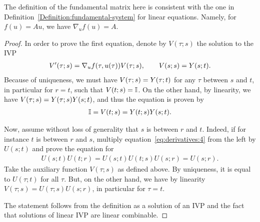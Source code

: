 \begin{remark}
  The definition of the fundamental matrix here is consistent with the
  one in Definition~\ref{Definition:fundamental-system} for linear
  equations. Namely, for $f(u) = Au$, we have $\nabla_u f(u) = A$.
\end{remark}



\begin{proof}
  In order to prove the first equation, denote by $V(\tau;s)$ the
  solution to the IVP
  \begin{gather*}
    V'(\tau;s) = \nabla_u f(\tau,u(\tau)) V(\tau;s),
    \qquad V(s;s) = \fundamental(s;t).
  \end{gather*}
  Because of uniqueness, we must have
  $V(\tau;s) = \fundamental(\tau;t)$ for any $\tau$ between $s$ and
  $t$, in particular for $r=t$, such that $V(t;s) = \mathbb I$. On the
  other hand, by linearity, we have
  $V(\tau;s) = \fundamental(\tau;s)\fundamental(s;t)$, and thus the
  equation is proven by
  \begin{gather*}
    \identity = V(t;s) = \fundamental(t;s)\fundamental(s;t).
  \end{gather*}

  Now, assume without loss of generality that $s$ is between $r$ and
  $t$. Indeed, if for instance $t$ is between $r$ and $s$, multiply
  equation~\eqref{eq:derivatives:4} from the left by $U(s;t)$ and
  prove the equation for
  \begin{gather*}
    U(s;t)U(t;r) = U(s;t)U(t;s)U(s;r) = U(s;r).
  \end{gather*}
  Take the auxiliary function $V(\tau;s)$ as defined above. By
  uniqueness, it is equal to $U(\tau;t)$ for all $\tau$. But, on the
  other hand, we have by linearity $V(\tau;s) = U(\tau;s)U(s;r)$, in
  particular for $\tau=t$.

  The statement follows from the definition as a solution of an IVP
  and the fact that solutions of linear IVP are linear combinable.
\end{proof}



